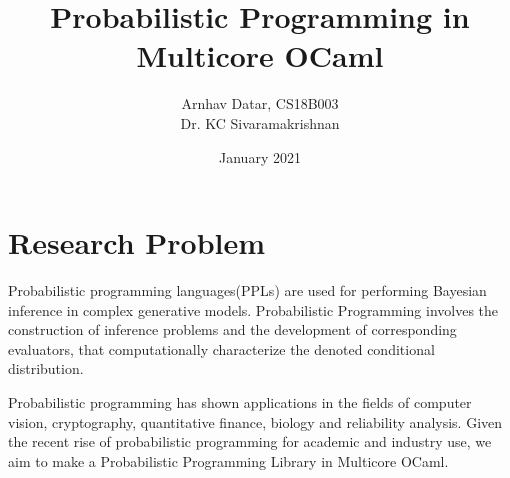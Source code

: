 \documentclass[12pt]{extarticle}
\title{Probabilistic Programming in Multicore OCaml}
\author{Arnhav Datar, CS18B003\\Dr. KC Sivaramakrishnan}
\date{January 2021}
\begin{document}
\maketitle

\section*{Research Problem}

Probabilistic programming languages(PPLs) are used for performing Bayesian inference \cite{Baydin_2019} in complex generative models. 
Probabilistic Programming \cite{vandemeent2018introduction} involves the construction of inference problems and the development of corresponding evaluators, that computationally characterize the denoted conditional distribution.

Probabilistic programming has shown applications \cite{appl} in the fields of computer vision, cryptography, quantitative finance, biology and reliability analysis. 
Given the recent rise of probabilistic programming for academic and industry use, we aim to make a Probabilistic Programming Library in Multicore OCaml. 

\end{document}
